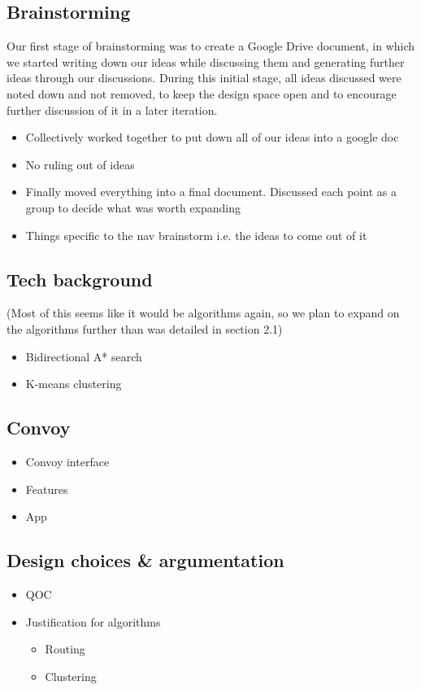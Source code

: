 \documentclass{article}
\begin{document}
\begin{itemize}
\subsection{Brainstorming} \label{}
Our first stage of brainstorming was to create a Google Drive document, in which we started writing down our ideas while discussing them and generating further ideas through our discussions. During this initial stage, all ideas discussed were noted down and not removed, to keep the design space open and to encourage further discussion of it in a later iteration.
	\begin{itemize}
		\item Collectively worked together to put down all of our ideas into a google doc
		\item No ruling out of ideas
		\item Finally moved everything into a final document. Discussed each point as a group to decide what was worth expanding
        \item Things specific to the nav brainstorm i.e. the ideas to come out of it
	\end{itemize}
\subsection{Tech background}
(Most of this seems like it would be algorithms again, so we plan to expand on the algorithms further than was detailed in section 2.1)
  \begin{itemize}
    \item Bidirectional A* search
    \item K-means clustering
  \end{itemize}
  
\subsection{Convoy}
	\begin{itemize}
    	\item Convoy interface
        \item Features
        \item App
    \end{itemize}
\subsection{Design choices \& argumentation}
  \begin{itemize}
    \item QOC
    \item Justification for algorithms
      \begin{itemize}
        \item Routing
        \item Clustering
      \end{itemize}
  \end{itemize}

\end{itemize}
\end{document}
